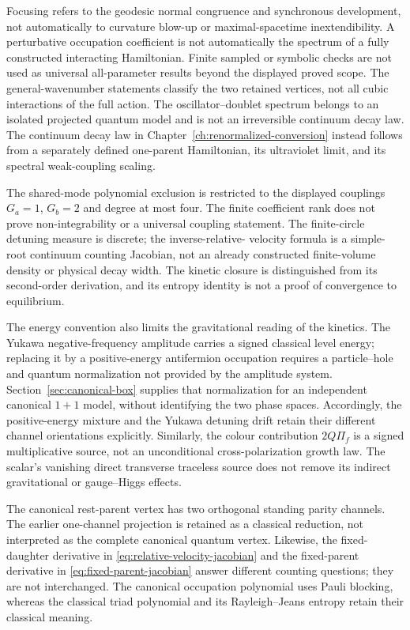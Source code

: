 \documentclass[11pt,a4paper,oneside]{book}
\theoremstyle{plain}
\theoremstyle{definition}
\theoremstyle{remark}
\begin{document}
Focusing refers to the geodesic normal congruence and synchronous development, not automatically to curvature blow-up or maximal-spacetime inextendibility. A perturbative occupation coefficient is not automatically the spectrum of a fully constructed interacting Hamiltonian. Finite sampled or symbolic checks are not used as universal all-parameter results beyond the displayed proved scope. The general-wavenumber statements classify the two retained vertices, not all cubic interactions of the full action. The oscillator--doublet spectrum belongs to an isolated projected quantum model and is not an irreversible continuum decay law.  The continuum decay law in Chapter~\ref{ch:renormalized-conversion} instead follows from a separately defined one-parent Hamiltonian, its ultraviolet limit, and its spectral weak-coupling scaling.

The shared-mode polynomial exclusion is restricted to the displayed
couplings $G_a=1$, $G_b=2$ and degree at most four.  The finite coefficient
rank does not prove non-integrability or a universal coupling statement.
The finite-circle detuning measure is discrete; the inverse-relative-
velocity formula is a simple-root continuum counting Jacobian, not an
already constructed finite-volume density or physical decay width.
The kinetic closure is distinguished from its second-order derivation,
and its entropy identity is not a proof of convergence to equilibrium.

The energy convention also limits the gravitational reading of the
kinetics.  The Yukawa negative-frequency amplitude carries a signed
classical level energy; replacing it by a positive-energy antifermion
occupation requires a particle--hole and quantum normalization not
provided by the amplitude system.  Section~\ref{sec:canonical-box}
supplies that normalization for an independent canonical $1+1$ model,
without identifying the two phase spaces.  Accordingly, the positive-energy
mixture and the Yukawa detuning drift retain their different channel
orientations explicitly.  Similarly, the colour contribution $2Q\Pi_f$
is a signed multiplicative source, not an unconditional cross-polarization
growth law.  The scalar's vanishing direct transverse traceless source
does not remove its indirect gravitational or gauge--Higgs effects.

The canonical rest-parent vertex has two orthogonal standing parity
channels.  The earlier one-channel projection is retained as a classical
reduction, not interpreted as the complete canonical quantum vertex.
Likewise, the fixed-daughter derivative in
\eqref{eq:relative-velocity-jacobian} and the fixed-parent derivative in
\eqref{eq:fixed-parent-jacobian} answer different counting questions;
they are not interchanged.  The canonical occupation polynomial uses
Pauli blocking, whereas the classical triad polynomial and its
Rayleigh--Jeans entropy retain their classical meaning.
\end{document}
